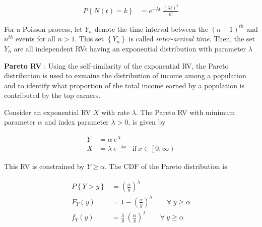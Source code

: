 \begin{align}
	P \left\{N(t) = k\right\} &= e^{-\lambda t} \ \frac{(\lambda t)^k}{k!}
\end{align}

For a Poisson process, let $ Y_n $ denote the time interval between the $ (n-1)^{th} $ and $ n^{th} $ events for all $ n > 1 $. This set $ \left\{Y_n\right\} $ is called \textit{inter-arrival time}. Then, the set $ Y_n $ are all independent RVs having an exponential distribution with parameter $ \lambda $ 

\textbf{Pareto RV} : Using the self-similarity of the exponential RV, the Pareto distribution is used to exmaine the distribution of income among a population and to identify what proportion of the total income earned by a population is contributed by the top earners.

Consider an exponential RV $ X $ with rate $ \lambda $. The Pareto RV with minimum parameter $ \alpha $ and index parameter $ \lambda > 0$, is given by

\begin{align}
	Y &= \alpha\ e^{X} \\
	X &= \lambda\ e^{-\lambda x} & \text{if}\ x \in \left[0, \infty\right) \nonumber
\end{align}

This RV is constrained by $ Y \geq \alpha $. The CDF of the Pareto distribution is

\begin{align}
	P \left\{Y > y\right\} &= \left(\frac{\alpha}{y}\right)^\lambda \nonumber \\
	F_Y(y) &= 1 - \left(\frac{\alpha}{y}\right)^\lambda \qquad \forall \  y \geq \alpha \\
	f_Y(y) &= \frac{\lambda}{y}\ \left(\frac{\alpha}{y}\right)^\lambda \qquad \forall \  y \geq \alpha
\end{align}

\begin{figure}[H]
\end{figure}

